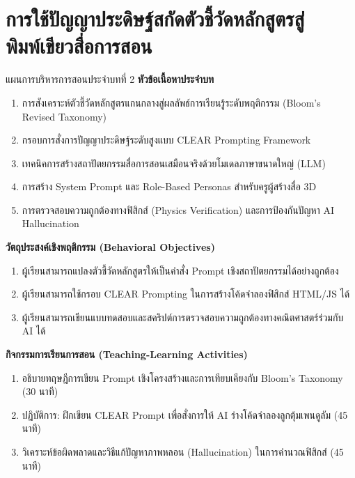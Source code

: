 \chapter{การใช้ปัญญาประดิษฐ์สกัดตัวชี้วัดหลักสูตรสู่พิมพ์เขียวสื่อการสอน}
\label{chap:ch02}

\begin{teachingplan}{แผนการบริหารการสอนประจำบทที่ 2}
\noindent\textbf{หัวข้อเนื้อหาประจำบท}
\begin{enumerate}[leftmargin=1.5em, itemsep=2pt]
    \item การสังเคราะห์ตัวชี้วัดหลักสูตรแกนกลางสู่ผลลัพธ์การเรียนรู้ระดับพฤติกรรม (Bloom's Revised Taxonomy)
    \item กรอบการสั่งการปัญญาประดิษฐ์ระดับสูงแบบ CLEAR Prompting Framework
    \item เทคนิคการสร้างสถาปัตยกรรมสื่อการสอนเสมือนจริงด้วยโมเดลภาษาขนาดใหญ่ (LLM)
    \item การสร้าง System Prompt และ Role-Based Personas สำหรับครูผู้สร้างสื่อ 3D
    \item การตรวจสอบความถูกต้องทางฟิสิกส์ (Physics Verification) และการป้องกันปัญหา AI Hallucination
\end{enumerate}

\noindent\textbf{วัตถุประสงค์เชิงพฤติกรรม (Behavioral Objectives)}
\begin{enumerate}[leftmargin=1.5em, itemsep=2pt]
    \item ผู้เรียนสามารถแปลงตัวชี้วัดหลักสูตรให้เป็นคำสั่ง Prompt เชิงสถาปัตยกรรมได้อย่างถูกต้อง
    \item ผู้เรียนสามารถใช้กรอบ CLEAR Prompting ในการสร้างโค้ดจำลองฟิสิกส์ HTML/JS ได้
    \item ผู้เรียนสามารถเขียนแบบทดสอบและสคริปต์การตรวจสอบความถูกต้องทางคณิตศาสตร์ร่วมกับ AI ได้
\end{enumerate}

\noindent\textbf{กิจกรรมการเรียนการสอน (Teaching-Learning Activities)}
\begin{enumerate}[leftmargin=1.5em, itemsep=2pt]
    \item อธิบายทฤษฎีการเขียน Prompt เชิงโครงสร้างและการเทียบเคียงกับ Bloom's Taxonomy (30 นาที)
    \item ปฏิบัติการ: ฝึกเขียน CLEAR Prompt เพื่อสั่งการให้ AI ร่างโค้ดจำลองลูกตุ้มเพนดูลัม (45 นาที)
    \item วิเคราะห์ข้อผิดพลาดและวิธีแก้ปัญหาภาพหลอน (Hallucination) ในการคำนวณฟิสิกส์ (45 นาที)
\end{enumerate}


\end{teachingplan}
